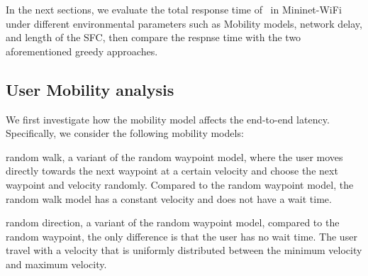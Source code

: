 



In the next sections, we evaluate the total response time of \myalgorithm\ in Mininet-WiFi under different environmental parameters such as Mobility models, network delay, and length of the SFC, then compare the respnse time with the two aforementioned greedy approaches.

\subsection{User Mobility analysis}
\label{sec:mobility model experiments}
We first investigate how the mobility model affects the end-to-end latency. Specifically, we consider the following mobility models:

 random walk, a variant of the random waypoint model\cite{rwp}, where the user moves directly towards the next waypoint at a certain velocity and choose the next waypoint and velocity randomly. Compared to the random waypoint model, the random walk model has a constant velocity and does not have a wait time.

 random direction, a variant of the random waypoint model, compared to the random waypoint, the only difference is that the user has no wait time. The user travel with a velocity that is uniformly distributed between the minimum velocity and maximum velocity.

